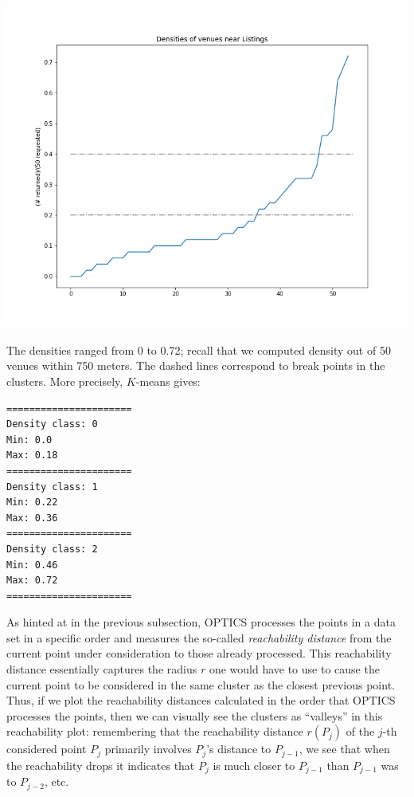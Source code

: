\documentclass{article}
\begin{document}
\begin{minipage}{0.6\textwidth}
\includegraphics[scale=0.45]{Densities_plot.png}
\end{minipage}
\begin{minipage}{0.35\textwidth}
The densities ranged from 0 to 0.72; recall that we computed density out of 50 venues within 750 meters. The dashed lines correspond to break points in the clusters. More precisely, $K$-means gives:
\begin{verbatim}
======================
Density class: 0
Min: 0.0
Max: 0.18
======================
Density class: 1
Min: 0.22
Max: 0.36
======================
Density class: 2
Min: 0.46
Max: 0.72
======================
\end{verbatim}
\end{minipage}

\vspace{1cm}
 As hinted at in the previous subsection, OPTICS processes the points in a data set in a specific order and measures the so-called {\em reachability distance} from the current point under consideration to those already processed. This reachability distance essentially captures the radius $r$ one would have to use to cause the current point to be considered in the same cluster as the closest previous point. Thus, if we plot the reachability distances calculated in the order that OPTICS processes the points, then we can visually see the clusters as ``valleys'' in this reachability plot: remembering that the reachability distance $r(P_j)$ of the $j$-th considered point $P_j$ primarily involves $P_j$'s distance to $P_{j-1}$, we see that when the reachability drops it indicates that $P_j$ is much closer to $P_{j-1}$ than $P_{j-1}$ was to $P_{j-2}$, etc. 
\end{document}
